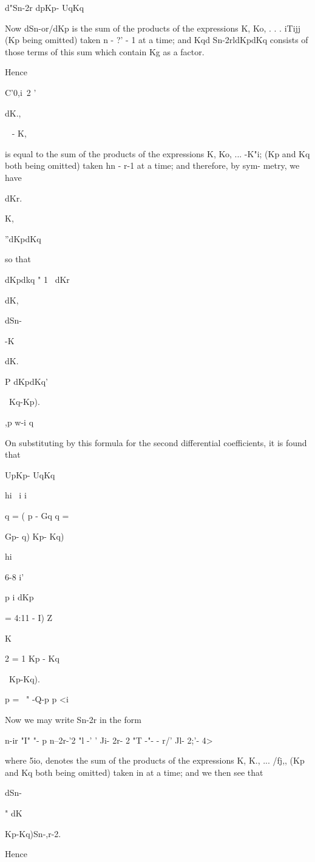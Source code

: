 {d"Sn-2r dpKp- UqKq


Now dSn-or/dKp is the sum of the products of the expressions K, Ko, .
. . iTijj (Kp being omitted) taken n - ?' - 1 at a time; and Kqd
Sn-2rldKpdKq consists of those terms of this sum which contain Kg as a
factor.

Hence

C'0,i\ 2 '

dK.,

~ - K,

is equal to the sum of the products of the expressions K, Ko, ...
-K"i; (Kp and Kq both being omitted) taken hn - r-1 at a time; and
therefore, by sym- metry, we have

dKr.

K,

''dKpdKq

so that

dKpdkq " 1 ~dKr

dK,

dSn-

-K

dK.

P dKpdKq'

\ Kq-Kp).

,p w-i q

On substituting by this formula for the second differential
coefficients, it is found that

UpKp- UqKq

hi \ i i

  q = ( p - Gq q = \ \ {Gp- q) Kp- Kq)\

hi

6-8 i'

p i dKp

= 4:11 - I) Z

K

2 = 1 Kp - Kq\

\ Kp-Kq).

p = \ " -Q-p p <i

Now we may write Sn-2r in the form

 n-ir "I" "- p n--2r-'2 "l -' ' Ji- 2r- 2 "T -"- - r/' Jl- 2;'- 4>

where 5io, denotes the sum of the products of the expressions K, K.,
... /fj,, (Kp and Kq both being omitted) taken in at a time; and we
then see that

dSn-

" dK

 Kp-Kq)Sn-,r-2.

Hence

}}
